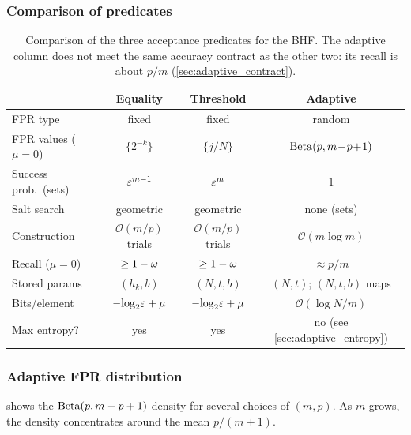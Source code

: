 \subsubsection{Comparison of predicates}

\begin{table}[ht]
\centering
\caption{Comparison of the three acceptance predicates for the BHF.
    The adaptive column does not meet the same accuracy contract as the
    other two: its recall is about $p/m$ (\cref{sec:adaptive_contract}).}
\label{tab:predicate_comparison}
\begin{tabular}{lccc}
\hline
 & \textbf{Equality} & \textbf{Threshold} & \textbf{Adaptive} \\
\hline
FPR type & fixed & fixed & random \\
FPR values ($\mu=0$) & $\{2^{-k}\}$ & $\{j/N\}$ & $\operatorname{Beta}(p,m\!-\!p\!+\!1)$ \\
Success prob.\ (sets) & $\varepsilon^{m-1}$ & $\varepsilon^{m}$ & $1$ \\
Salt search & geometric & geometric & none (sets) \\
Construction & $\mathcal{O}(m/p)$ trials & $\mathcal{O}(m/p)$ trials & $\mathcal{O}(m \log m)$ \\
Recall ($\mu=0$) & $\geq 1 - \omega$ & $\geq 1 - \omega$ & $\approx p/m$ \\
Stored params & $(h_k, b)$ & $(N, t, b)$ & $(N, t)$; $(N,t,b)$ maps \\
Bits/element & $-\!\log_2\!\varepsilon + \mu$ & $-\!\log_2\!\varepsilon + \mu$ & $\mathcal{O}(\log N / m)$ \\
Max entropy? & yes & yes & no (see \cref{sec:adaptive_entropy}) \\
\hline
\end{tabular}
\end{table}

\subsubsection{Adaptive FPR distribution}

 shows the $\operatorname{Beta}(p, m - p + 1)$ density for
several choices of $(m, p)$.
As $m$ grows, the density concentrates around the mean $p/(m+1)$.

